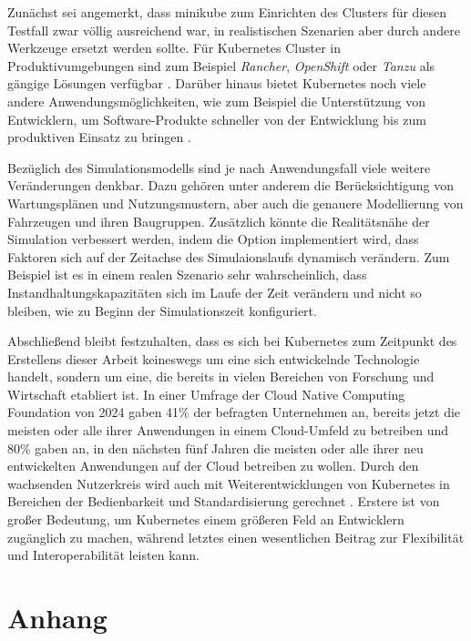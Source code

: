 \documentclass[11pt,a4paper]{article}
\begin{document}
Zunächst sei angemerkt, dass minikube zum Einrichten des Clusters für diesen Testfall
zwar völlig ausreichend war, in realistischen Szenarien aber durch andere Werkzeuge ersetzt werden sollte.
Für Kubernetes Cluster in Produktivumgebungen sind zum Beispiel \emph{Rancher}, \emph{OpenShift} oder \emph{Tanzu} als
gängige Lösungen verfügbar \cite{rancher}. Darüber hinaus bietet Kubernetes noch viele andere 
Anwendungsmöglichkeiten, wie zum Beispiel die Unterstützung von Entwicklern, um Software-Produkte
schneller von der Entwicklung bis zum produktiven Einsatz zu bringen \cite{Schmeling_Dargatz_2022}.

Bezüglich des Simulationsmodells sind je nach Anwendungsfall viele weitere Veränderungen denkbar.
Dazu gehören unter anderem die Berücksichtigung von Wartungsplänen und Nutzungsmustern, aber auch
die genauere Modellierung von Fahrzeugen und ihren Baugruppen. 
Zusätzlich könnte die Realitätsnähe der Simulation verbessert werden, indem die Option
implementiert wird, dass Faktoren sich auf der Zeitachse des Simulaionslaufs dynamisch verändern.
Zum Beispiel ist es in einem realen Szenario sehr wahrscheinlich, dass Instandhaltungskapazitäten
sich im Laufe der Zeit verändern und nicht so bleiben, wie zu Beginn der Simulationszeit konfiguriert.

Abschließend bleibt festzuhalten, dass es sich bei Kubernetes zum Zeitpunkt des Erstellens dieser
Arbeit keineswegs um eine sich entwickelnde Technologie handelt, sondern um eine, die bereits
in vielen Bereichen von Forschung und Wirtschaft etabliert ist. In einer Umfrage der 
Cloud Native Computing Foundation von 2024 \cite{cncf} gaben 41\% der befragten Unternehmen an,
bereits jetzt die meisten oder alle ihrer Anwendungen in einem Cloud-Umfeld zu betreiben und
80\% gaben an, in den nächsten fünf Jahren die meisten oder alle ihrer neu entwickelten Anwendungen
auf der Cloud betreiben zu wollen. Durch den wachsenden Nutzerkreis wird auch mit Weiterentwicklungen
von Kubernetes in Bereichen der Bedienbarkeit und Standardisierung gerechnet \cite{emerging_trends}.
Erstere ist von großer Bedeutung, um Kubernetes einem größeren Feld an Entwicklern zugänglich
zu machen, während letztes einen wesentlichen Beitrag zur Flexibilität und Interoperabilität
leisten kann.

\section{Anhang}


% 
% 

\printbibliography
\end{document}
